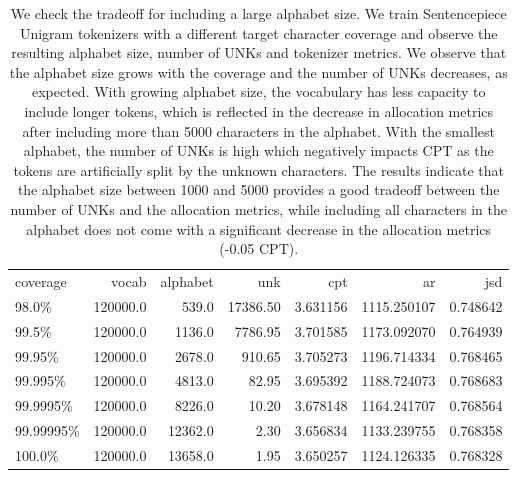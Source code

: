 \begin{table}
\centering
\caption{We check the tradeoff for including a large alphabet size. We train Sentencepiece Unigram tokenizers with a different target character coverage and observe the resulting alphabet size, number of UNKs and tokenizer metrics. We observe that the alphabet size grows with the coverage and the number of UNKs decreases, as expected. With growing alphabet size, the vocabulary has less capacity to include longer tokens, which is reflected in the decrease in allocation metrics after including more than 5000 characters in the alphabet. With the smallest alphabet, the number of UNKs is high which negatively impacts CPT as the tokens are artificially split by the unknown characters. The results indicate that the alphabet size between 1000 and 5000 provides a good tradeoff between the number of UNKs and the allocation metrics, while including all characters in the alphabet does not come with a significant decrease in the allocation metrics (-0.05 CPT).}
\label{tab:coverage_influence}
\begin{tabular}{lrrrrrr}
\toprule
 coverage &    vocab &  alphabet &      unk &      cpt &          ar &      jsd \\
    98.0\% & 120000.0 &     539.0 & 17386.50 & 3.631156 & 1115.250107 & 0.748642 \\
\midrule
    99.5\% & 120000.0 &    1136.0 &  7786.95 & 3.701585 & 1173.092070 & 0.764939 \\
   99.95\% & 120000.0 &    2678.0 &   910.65 & 3.705273 & 1196.714334 & 0.768465 \\
  99.995\% & 120000.0 &    4813.0 &    82.95 & 3.695392 & 1188.724073 & 0.768683 \\
 99.9995\% & 120000.0 &    8226.0 &    10.20 & 3.678148 & 1164.241707 & 0.768564 \\
99.99995\% & 120000.0 &   12362.0 &     2.30 & 3.656834 & 1133.239755 & 0.768358 \\
   100.0\% & 120000.0 &   13658.0 &     1.95 & 3.650257 & 1124.126335 & 0.768328 \\
\bottomrule
\end{tabular}
\end{table}
